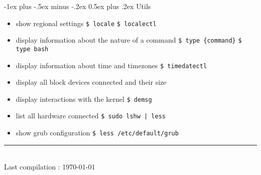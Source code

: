 \documentclass[11pt, landscape]{article}
\makeatletter
\renewcommand{\section}{\@startsection{section}{1}{0mm}%
	{-1ex plus -.5ex minus -.2ex}%
	{0.5ex plus .2ex}%
	{\normalfont\large\bfseries}}
\makeatother
\begin{document}
\begin{multicols}{3}
		\section {Utils}
			\begin {itemize}
				\item {show regional settings}
					\subitem \texttt{\$ locale}
					\subitem \texttt{\$ localectl}
				\item {display information about the nature of a command}
					\subitem \texttt{\$ type \{command\}}
						\subsubitem \texttt{\$ type bash}
				\item {display information about time and timezones}
					\subitem \texttt{\$ timedatectl}
				\item {display all block devices connected and their size}
				\item {display interactions with the kernel}
					\subitem \texttt{\$ demsg}
				\item {list all hardware connected} 
					\subitem \texttt{\$ sudo  lshw | less}
				\item {show grub configuration}
					\subitem \texttt{\$ less /etc/default/grub}
			\end {itemize}
			
		\rule{0.3\linewidth}{0.25pt}
		\scriptsize
		
		\\
		Last compilation : \today
	\end{multicols}
\end{document}
